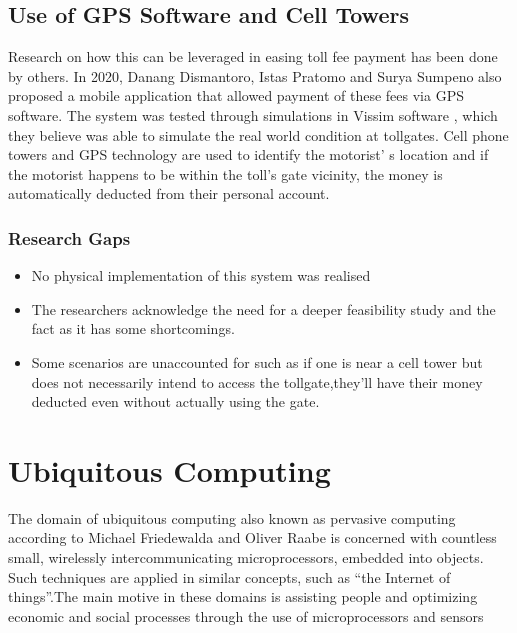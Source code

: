 \subsection{Use of GPS Software and Cell Towers}
Research on how this can be leveraged in easing toll fee payment has been done by others. In 2020, Danang Dismantoro, Istas Pratomo and Surya Sumpeno also proposed a mobile application that allowed payment of these fees via GPS software\cite{el-rabbany_introduction_2002,dismantoro_minimizing_2020}. The system was tested through simulations in Vissim software \cite{ptv_vissim_traffic_2022}, which they believe was able to simulate the real world condition at tollgates. Cell phone towers and GPS technology are used to identify the motorist’ s location and if the motorist happens to be within the toll’s gate vicinity, the money is automatically deducted from their personal account.

\subsubsection{Research Gaps}
\begin{itemize}
    \item No physical implementation of this system was realised
    \item The researchers acknowledge the need for a deeper feasibility study and the fact as it has some shortcomings.
    \item Some scenarios are unaccounted for such as if one is near a cell tower but does not necessarily intend to access the tollgate,they’ll have their money deducted even without actually using the gate.
\end{itemize}


\section{Ubiquitous Computing}
The domain of ubiquitous computing also known as pervasive computing according to Michael Friedewalda and Oliver Raabe is concerned with countless small, wirelessly intercommunicating microprocessors, embedded into objects. Such techniques are applied in similar concepts, such as ``the Internet of things''.The main motive in these domains is assisting people and optimizing economic and social processes through the use of microprocessors and sensors

